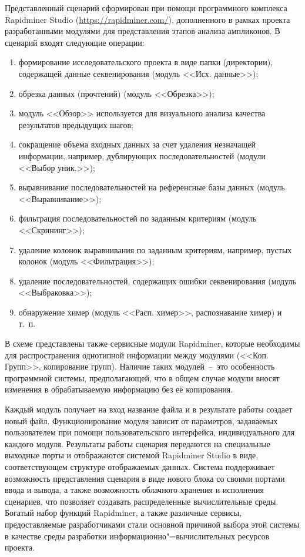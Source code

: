\documentclass[a4paper,12pt,openany,final]{extreport}
\begin{document}
Представленный сценарий сформирован при помощи программного комплекса Rapidminer Studio (\url{https://rapidminer.com/}), дополненного в рамках проекта разработанными модулями для представления этапов анализа ампликонов. В сценарий входят следующие операции:

\begin{enumerate}
\item формирование исследовательского проекта в виде папки (директории), содержащей данные секвенирования (модуль <<Исх. данные>>);
\item обрезка данных (прочтений) (модуль <<Обрезка>>);
\item модуль <<Обзор>> используется для визуального анализа качества результатов предыдущих шагов;
\item сокращение объема входных данных за счет удаления незначащей информации, например, дублирующих последовательностей (модули <<Выбор уник.>>);
\item выравнивание последовательностей на референсные базы данных (модуль <<Выравнивание>>);
\item фильтрация последовательностей по заданным критериям (модуль <<Скрининг>>);
\item удаление колонок выравнивания по заданным критериям, например, пустых колонок (модуль <<Фильтрация>>);
\item удаление последовательностей, содержащих ошибки секвенирования (модуль <<Выбраковка>>);
\item обнаружение химер (модуль <<Расп. химер>>, распознавание химер) и т.~п.
\end{enumerate}

В схеме представлены также сервисные модули Rapidminer, которые необходимы для распространения однотипной информации между модулями (<<Коп. Групп>>, копирование групп). Наличие таких модулей~--~это особенность программной системы, предполагающей, что в общем случае модули вносят изменения в обрабатываемую информацию без её копирования.

Каждый модуль получает на вход название файла и в результате работы создает новый файл. Функционирование модуля зависит от параметров, задаваемых пользователем при помощи пользовательского интерфейса, индивидуального для каждого модуля. Результаты работы сценария передаются на специальные выходные порты и отображаются системой Rapidminer Studio в виде, соответствующем структуре отображаемых данных. Система поддерживает возможность представления сценария в виде нового блока со своими портами ввода и вывода, а также возможность облачного хранения и исполнения сценариев, что позволяет создавать распределенные вычислительные среды.  Богатый набор функций Rapidminer, а также различные сервисы, предоставляемые разработчиками стали основной причиной выбора этой системы в качестве среды разработки информационно"=вычислительных ресурсов проекта.
\end{document}

